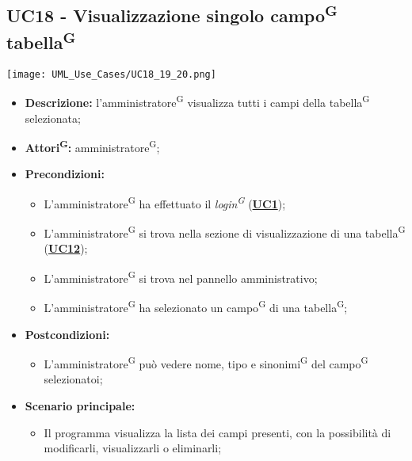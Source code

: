 \subsection{UC18 - Visualizzazione singolo campo\textsuperscript{G} tabella\textsuperscript{G}}
\label{sec:UC18}
\texttt{[image: UML\_Use\_Cases/UC18\_19\_20.png]}
\begin{itemize}
	\item \textbf{Descrizione:} l’amministratore\textsuperscript{G} visualizza tutti i campi della tabella\textsuperscript{G} selezionata;
	\item \textbf{Attori\textsuperscript{G}:} amministratore\textsuperscript{G};
	\item \textbf{Precondizioni:} 
	\begin{itemize}
		\item L’amministratore\textsuperscript{G} ha effettuato il \textit{login\textsuperscript{G}} (\hyperref[sec:UC1]{\textbf{UC1}});
		\item L’amministratore\textsuperscript{G} si trova nella sezione di visualizzazione di una tabella\textsuperscript{G} (\hyperref[sec:UC12]{\textbf{UC12}});
		\item L’amministratore\textsuperscript{G} si trova nel pannello amministrativo;
		\item L'amministratore\textsuperscript{G} ha selezionato un campo\textsuperscript{G} di una tabella\textsuperscript{G};
	\end{itemize}
	\item \textbf{Postcondizioni:} 
	\begin{itemize}
		\item L'amministratore\textsuperscript{G} può vedere nome, tipo e sinonimi\textsuperscript{G} del campo\textsuperscript{G} selezionatoi;
	\end{itemize}
	\item \textbf{Scenario principale:} 
	\begin{itemize}
		\item Il programma visualizza la lista dei campi presenti, con la possibilità di modificarli, visualizzarli o eliminarli;
	\end{itemize}
\end{itemize}

